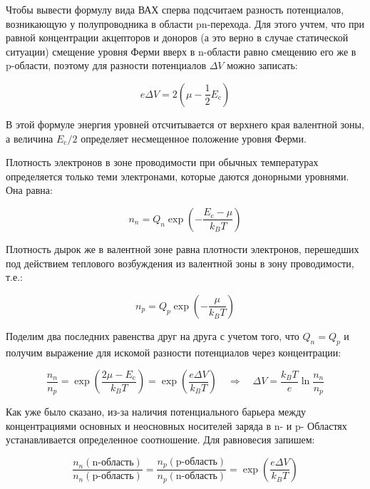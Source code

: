 \documentclass[a4paper, 12pt]{article}
\newcommand{\qrq}
{\ensuremath{\quad \Rightarrow \quad}} %
\begin{document}
Чтобы вывести формулу вида ВАХ сперва подсчитаем разность потенциалов, возникающую у полупроводника в области pn-перехода. Для этого учтем, что при равной концентрации акцепторов и доноров (а это верно в случае статической ситуации) смещение уровня Ферми вверх в n-области равно смещению его же в p-области, поэтому для разности потенциалов $\Delta V$ можно записать: 

\begin{equation}
	e\Delta V = 2 \left(\mu - \frac{1}{2} E_{\text{c}}\right)
\end{equation}

В этой формуле энергия уровней отсчитывается от верхнего края валентной зоны, а величина $E_{\text{c}}/2$ определяет несмещенное положение уровня Ферми.

Плотность электронов в зоне проводимости при обычных температурах определяется только теми электронами, которые даются донорными уровнями. Она равна:

\begin{equation}
	n_n = Q_n \exp\left(-\frac{E_{\text{c}} - \mu}{k_B T}\right)
\end{equation}

Плотность дырок же в валентной зоне равна плотности электронов, перешедших под действием теплового возбуждения из валентной зоны в зону проводимости, т.е.:

\begin{equation}
	n_p = Q_p \exp\left(-\frac{\mu}{k_B T}\right)
\end{equation}

Поделим два последних равенства друг на друга с учетом того, что $Q_n = Q_p$ и получим выражение для искомой разности потенциалов через концентрации:

\begin{equation}
	\frac{n_n}{n_p} = \exp\left(\frac{2\mu - E_\text{c}}{k_B T}\right) = \exp\left(\frac{e \Delta V}{k_B T}\right) \qrq \Delta V = \frac{k_B T}{e} \ln \frac{n_n}{n_p}
\end{equation}

Как уже было сказано, из-за наличия потенциального барьера между концентрациями основных и неосновных носителей заряда в n- и p- Областях устанавливается определенное соотношение. Для равновесия запишем:

\begin{equation}
	\frac{n_n(\text{n-область})}{n_n(\text{p-область})} = \frac{n_p(\text{p-область})}{n_p(\text{n-область})} = \exp\left(\frac{e \Delta V}{k_B T}\right)
\end{equation}
\end{document}

